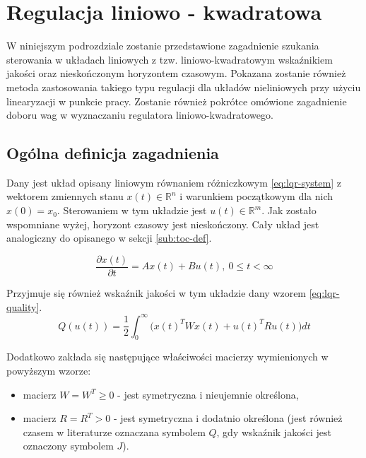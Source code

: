 \section{Regulacja liniowo - kwadratowa}
\label{sec:lqr}

W niniejszym podrozdziale zostanie przedstawione zagadnienie szukania sterowania w układach liniowych z tzw. liniowo-kwadratowym wskaźnikiem jakości oraz nieskończonym horyzontem czasowym. Pokazana zostanie również metoda zastosowania takiego typu regulacji dla układów nieliniowych przy użyciu linearyzacji w punkcie pracy. Zostanie również pokrótce omówione zagadnienie doboru wag w wyznaczaniu regulatora liniowo-kwadratowego.

\subsection{Ogólna definicja zagadnienia}
\label{sub:lqr-def}

Dany jest układ opisany liniowym równaniem różniczkowym \ref{eq:lqr-system} z wektorem zmiennych stanu $x(t) \in \mathbb{R}^{n}$ i warunkiem początkowym dla nich $x(0) = x_{0}$. Sterowaniem w tym układzie jest $u(t) \in \mathbb{R}^{m}$. Jak zostało wspomniane wyżej, horyzont czasowy jest nieskończony. Cały układ jest analogiczny do opisanego w sekcji \ref{sub:toc-def}.

\begin{equation}\label{eq:lqr-system}
\frac{\partial x(t)}{\partial t} = Ax(t) + Bu(t),~ 0 \leq t < \infty
\end{equation}

Przyjmuje się również wskaźnik jakości w tym układzie dany wzorem \ref{eq:lqr-quality}.
\begin{equation}\label{eq:lqr-quality}
Q(u(t)) = \frac{1}{2}\int_{0}^{\infty} \Big(x(t)^{T}Wx(t) + u(t)^{T}Ru(t)\Big)dt
\end{equation}

Dodatkowo zakłada się następujące właściwości macierzy wymienionych w powyższym wzorze:
\begin{itemize}
    \item macierz $W = W^{T} \geq 0$ - jest symetryczna i nieujemnie określona,
    \item macierz $R = R^{T} > 0$ - jest symetryczna i dodatnio określona (jest również czasem w literaturze oznaczana symbolem $Q$, gdy wskaźnik jakości jest oznaczony symbolem $J$).
\end{itemize}

